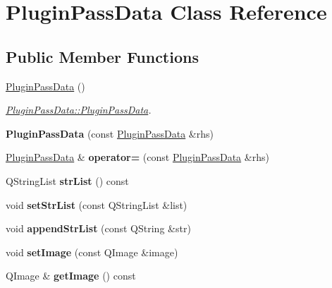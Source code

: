 \hypertarget{class_plugin_pass_data}{\section{Plugin\-Pass\-Data Class Reference}
\label{class_plugin_pass_data}
}
\subsection*{Public Member Functions}
\begin{DoxyCompactItemize}
\item 
\hypertarget{class_plugin_pass_data_a1f1d979da0fabd694694080061fbacec}{\hyperlink{class_plugin_pass_data_a1f1d979da0fabd694694080061fbacec}{Plugin\-Pass\-Data} ()}\label{class_plugin_pass_data_a1f1d979da0fabd694694080061fbacec}

\begin{DoxyCompactList}\small\item\em \hyperlink{class_plugin_pass_data_a1f1d979da0fabd694694080061fbacec}{Plugin\-Pass\-Data\-::\-Plugin\-Pass\-Data}. \end{DoxyCompactList}\item 
\hypertarget{class_plugin_pass_data_a2b7fb9d514256481ede43828a6d87720}{{\bfseries Plugin\-Pass\-Data} (const \hyperlink{class_plugin_pass_data}{Plugin\-Pass\-Data} \&rhs)}\label{class_plugin_pass_data_a2b7fb9d514256481ede43828a6d87720}

\item 
\hypertarget{class_plugin_pass_data_a99626becacfee9af079074e1aee326e2}{\hyperlink{class_plugin_pass_data}{Plugin\-Pass\-Data} \& {\bfseries operator=} (const \hyperlink{class_plugin_pass_data}{Plugin\-Pass\-Data} \&rhs)}\label{class_plugin_pass_data_a99626becacfee9af079074e1aee326e2}

\item 
\hypertarget{class_plugin_pass_data_a9b30d96902dc5d5674779f4787b50f17}{Q\-String\-List {\bfseries str\-List} () const }\label{class_plugin_pass_data_a9b30d96902dc5d5674779f4787b50f17}

\item 
\hypertarget{class_plugin_pass_data_acb04c495ddea543c62b3dad2443c0244}{void {\bfseries set\-Str\-List} (const Q\-String\-List \&list)}\label{class_plugin_pass_data_acb04c495ddea543c62b3dad2443c0244}

\item 
\hypertarget{class_plugin_pass_data_a04a887d435f0821223014abe8670fa9e}{void {\bfseries append\-Str\-List} (const Q\-String \&str)}\label{class_plugin_pass_data_a04a887d435f0821223014abe8670fa9e}

\item 
\hypertarget{class_plugin_pass_data_a22e902d107d714dbac1ad37cfa4dde69}{void {\bfseries set\-Image} (const Q\-Image \&image)}\label{class_plugin_pass_data_a22e902d107d714dbac1ad37cfa4dde69}

\item 
\hypertarget{class_plugin_pass_data_aea26264180123c47956fdf2078a9912f}{Q\-Image \& {\bfseries get\-Image} () const }\label{class_plugin_pass_data_aea26264180123c47956fdf2078a9912f}

\end{DoxyCompactItemize}



